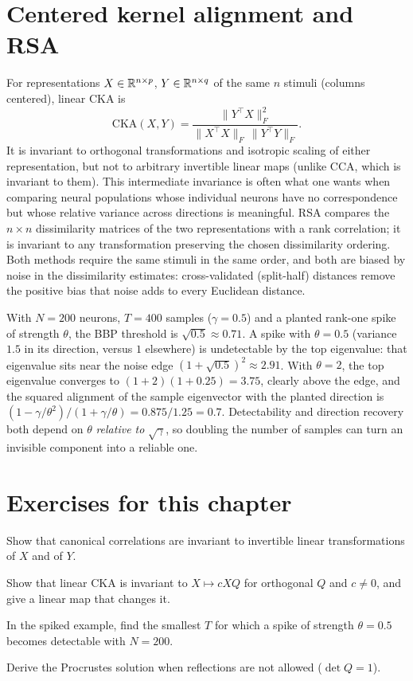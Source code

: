 \section{Centered kernel alignment and RSA}
For representations $X\in\mathbb{R}^{n\times p}$, $Y\in\mathbb{R}^{n\times q}$ of the same
$n$ stimuli (columns centered), linear CKA is
\[
\mathrm{CKA}(X,Y)=\frac{\|Y^\top X\|_F^2}{\|X^\top X\|_F\,\|Y^\top Y\|_F}.
\]
It is invariant to orthogonal transformations and isotropic scaling of
either representation, but not to arbitrary invertible linear maps
(unlike CCA, which is invariant to them). This intermediate invariance
is often what one wants when comparing neural populations whose
individual neurons have no correspondence but whose relative variance
across directions is meaningful. RSA compares the $n\times n$
dissimilarity matrices of the two representations with a rank
correlation; it is invariant to any transformation preserving the chosen
dissimilarity ordering. Both methods require the same stimuli in the
same order, and both are biased by noise in the dissimilarity
estimates: cross-validated (split-half) distances remove the positive
bias that noise adds to every Euclidean distance.

\begin{example}
With $N=200$ neurons, $T=400$ samples ($\gamma=0.5$) and a planted
rank-one spike of strength $\theta$, the BBP threshold is
$\sqrt{0.5}\approx0.71$. A spike with $\theta=0.5$ (variance $1.5$ in its
direction, versus $1$ elsewhere) is undetectable by the top eigenvalue:
that eigenvalue sits near the noise edge $(1+\sqrt{0.5})^2\approx2.91$.
With $\theta=2$, the top eigenvalue converges to
$(1+2)(1+0.25)=3.75$, clearly above the edge, and the squared alignment
of the sample eigenvector with the planted direction is
$(1-\gamma/\theta^2)/(1+\gamma/\theta)=0.875/1.25=0.7$. Detectability and
direction recovery both depend on $\theta$ \emph{relative to} $\sqrt\gamma$,
so doubling the number of samples can turn an invisible component into a
reliable one.
\end{example}

\section*{Exercises for this chapter}
\begin{exercise}
Show that canonical correlations are invariant to invertible linear
transformations of $X$ and of $Y$.
\end{exercise}
\begin{exercise}
Show that linear CKA is invariant to $X\mapsto cXQ$ for orthogonal $Q$
and $c\ne0$, and give a linear map that changes it.
\end{exercise}
\begin{exercise}
In the spiked example, find the smallest $T$ for which a spike of
strength $\theta=0.5$ becomes detectable with $N=200$.
\end{exercise}
\begin{exercise}
Derive the Procrustes solution when reflections are not allowed
($\det Q=1$).
\end{exercise}
